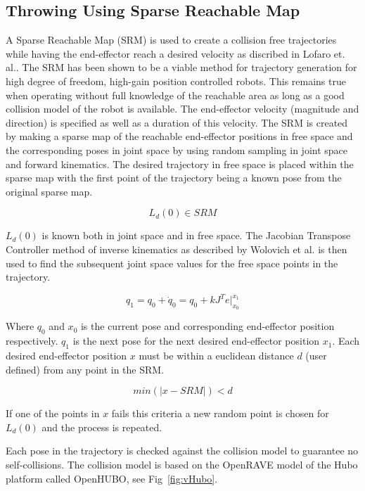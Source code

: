 \subsection{\bf Throwing Using Sparse Reachable Map}\label{sec:sec:srm}

A Sparse Reachable Map (SRM) is used to create a collision free trajectories while having the end-effector reach a desired velocity as discribed in Lofaro et. al.\cite{dlofaro-srm}.
The SRM has been shown to be a viable method for trajectory generation for high degree of freedom, high-gain position controlled robots.  This remains true when operating without full knowledge of the reachable area as long as a good collision model of the robot is available. 
The end-effector velocity (magnitude and direction) is specified as well as a duration of this velocity. 
The SRM is created by making a sparse map of the reachable end-effector positions in free space and the corresponding poses in joint space by using random sampling in joint space and forward kinematics. 
The desired trajectory in free space is placed within the sparse map with the first point of the trajectory being a known pose from the original sparse map. 

\begin{equation}
L_d(0) \in SRM
\end{equation}

$L_d(0)$ is known both in joint space and in free space.
The Jacobian Transpose Controller method of inverse kinematics as described by Wolovich et al.\cite{4048118} is then used to find the subsequent joint space values for the free space points in the trajectory. 

\begin{equation}
q_1 = q_0 + \dot{q}_0 = q_0 + kJ^Te|_{x_0}^{x_1}
\end{equation}

Where $q_0$ and $x_0$ is the current pose and corresponding end-effector position respectively.  $q_1$ is the next pose for the next desired end-effector position $x_1$.
Each desired end-effector position $x$ must be within a euclidean distance $d$ (user defined) from any point in the SRM.

\begin{equation}
min \left(|x - SRM| \right) < d
\end{equation}

If one of the points in $x$ fails this criteria a new random point is chosen for $L_d(0)$ and the process is repeated.

Each pose in the trajectory is checked against the collision model to guarantee no self-collisions.  The collision model is based on the OpenRAVE model of the Hubo platform called OpenHUBO, see Fig~\ref{fig:vHubo}.

